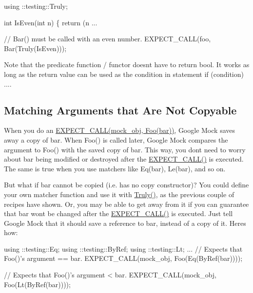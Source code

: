 \begin{DoxyCode}
using ::testing::Truly;

int IsEven(int n) \{ return (n %
...

  // Bar() must be called with an even number.
  EXPECT\_CALL(foo, Bar(Truly(IsEven)));
\end{DoxyCode}


Note that the predicate function / functor doesn\textquotesingle{}t have to return {\ttfamily bool}. It works as long as the return value can be used as the condition in statement {\ttfamily if (condition) ...}.

\subsection*{Matching Arguments that Are Not Copyable}

When you do an {\ttfamily \hyperlink{gmock-spec-builders_8h_a535a6156de72c1a2e25a127e38ee5232}{E\+X\+P\+E\+C\+T\+\_\+\+C\+A\+L\+L(mock\+\_\+obj, Foo(bar))}}, Google Mock saves away a copy of {\ttfamily bar}. When {\ttfamily Foo()} is called later, Google Mock compares the argument to {\ttfamily Foo()} with the saved copy of {\ttfamily bar}. This way, you don\textquotesingle{}t need to worry about {\ttfamily bar} being modified or destroyed after the {\ttfamily \hyperlink{gmock-spec-builders_8h_a535a6156de72c1a2e25a127e38ee5232}{E\+X\+P\+E\+C\+T\+\_\+\+C\+A\+L\+L()}} is executed. The same is true when you use matchers like {\ttfamily Eq(bar)}, {\ttfamily Le(bar)}, and so on.

But what if {\ttfamily bar} cannot be copied (i.\+e. has no copy constructor)? You could define your own matcher function and use it with {\ttfamily \hyperlink{namespacetesting_a5faf05cfaae6074439960048e478b1c8}{Truly()}}, as the previous couple of recipes have shown. Or, you may be able to get away from it if you can guarantee that {\ttfamily bar} won\textquotesingle{}t be changed after the {\ttfamily \hyperlink{gmock-spec-builders_8h_a535a6156de72c1a2e25a127e38ee5232}{E\+X\+P\+E\+C\+T\+\_\+\+C\+A\+L\+L()}} is executed. Just tell Google Mock that it should save a reference to {\ttfamily bar}, instead of a copy of it. Here\textquotesingle{}s how\+:


\begin{DoxyCode}
using ::testing::Eq;
using ::testing::ByRef;
using ::testing::Lt;
...
  // Expects that Foo()'s argument == bar.
  EXPECT\_CALL(mock\_obj, Foo(Eq(ByRef(bar))));

  // Expects that Foo()'s argument < bar.
  EXPECT\_CALL(mock\_obj, Foo(Lt(ByRef(bar))));
\end{DoxyCode}


